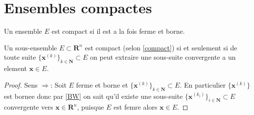 \section{Ensembles compactes}
\begin{definition}\label{compact}
Un ensemble $E$ est compact si il est a la fois ferme et borne.
\end{definition}
\begin{theorem}
Un sous-ensemble $E\subset \mathbf{R}^{n}$ est compact (selon \ref{compact}) si et seulement si de toute suite $\{ \boldsymbol{x}^{(k)} \}_{k\in \mathbf{N}}\subset E$ on peut extraire une sous-suite convergente a un element $\boldsymbol{x}\in E$.
\end{theorem}
\begin{proof}
Sens $\Rightarrow$: Soit $E$ ferme et borne et $\{ \boldsymbol{x}^{(k)} \}_{k\in \mathbf{N}}\subset E$. En particulier $\{ \boldsymbol{x}^{(k)} \}$ est bornee donc par \ref{BW} on sait qu'il existe une sous-suite $\{ \boldsymbol{x}^{(k_{i})} \}_{i\in \mathbf{N}}\subset E$ convergente vers $\boldsymbol{x}\in \mathbf{R}^{n}$, puisque $E$ est femre alors $\boldsymbol{x}\in E$.
\end{proof}